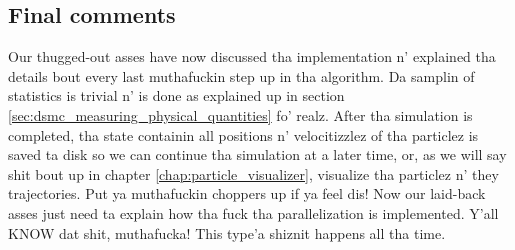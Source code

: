 \subsection{Final comments}
Our thugged-out asses have now discussed tha implementation n' explained tha details bout every last muthafuckin step up in tha algorithm. Da samplin of statistics is trivial n' is done as explained up in section \ref{sec:dsmc_measuring_physical_quantities} fo' realz. After tha simulation is completed, tha state containin all positions n' velocitizzlez of tha particlez is saved ta disk so we can continue tha simulation at a later time, or, as we will say shit bout up in chapter \ref{chap:particle_visualizer}, visualize tha particlez n' they trajectories. Put ya muthafuckin choppers up if ya feel dis! Now our laid-back asses just need ta explain how tha fuck tha parallelization is implemented. Y'all KNOW dat shit, muthafucka! This type'a shiznit happens all tha time. 